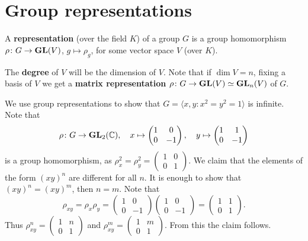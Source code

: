 \chapter{Group representations}

\begin{definition}
	A \textbf{representation} (over the field $K$) of a group $G$ is a group homomorphism
	$\rho\colon G\to\mathbf{GL}(V)$, $g\mapsto\rho_g$, for some vector space $V$ (over $K$).
\end{definition}

The \textbf{degree} of $V$ will be the dimension of $V$. Note that
if $\dim V=n$, fixing a basis of $V$ we get a \textbf{matrix representation} 
$\rho\colon G\to\mathbf{GL}(V)\simeq\mathbf{GL}_n(V)$ of $G$.  

\begin{example}
	We use group representations to show that 
	$G=\langle x,y:x^2=y^2=1\rangle$ is infinite. Note that
	\[
	\rho\colon G\to\mathbf{GL}_2(\mathbb{C}),
	\quad
	x\mapsto\begin{pmatrix}
		1&0\\
		0&-1	
	\end{pmatrix},\quad
 	y\mapsto\begin{pmatrix}
		1&1\\
		0&-1	
	\end{pmatrix}
 	\]
 	is a group homomorphism, as $\rho_x^2=\rho_y^2=\begin{pmatrix}
		1&0\\
		0&1	
	\end{pmatrix}$. We claim that the elements of the form $(xy)^n$ are
	different for all $n$. It is enough to show that   
	$(xy)^n=(xy)^m$, then $n=m$. Note that
	\[
	\rho_{xy}=\rho_x\rho_y=\begin{pmatrix}
		1&0\\
		0&-1	
	\end{pmatrix}
	\begin{pmatrix}
		1&0\\
		0&-1	
	\end{pmatrix}
	=\begin{pmatrix}
		1&1\\
		0&1	
	\end{pmatrix}.
	\]
	Thus $\rho_{xy}^n=\begin{pmatrix}
		1&n\\
		0&1	
	\end{pmatrix}$ and 
	$\rho_{xy}^m=\begin{pmatrix}
		1&m\\
		0&1	
	\end{pmatrix}$. From this the claim follows.
\end{example}

